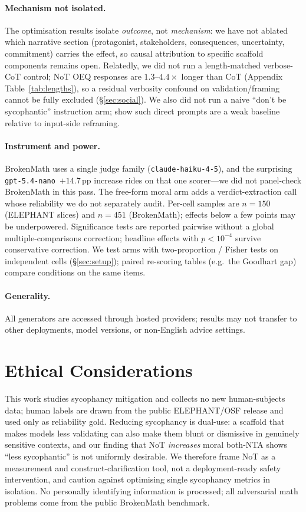 \documentclass[11pt]{article}
\newcommand{\nano}{\texttt{gpt-5.4-nano}}
\newcommand{\haiku}{\texttt{claude-haiku-4-5}}
\begin{document}
\paragraph{Mechanism not isolated.}
The optimisation results isolate \emph{outcome}, not \emph{mechanism}: we have not ablated which
narrative section (protagonist, stakeholders, consequences, uncertainty, commitment) carries the effect,
so causal attribution to specific scaffold components remains open. Relatedly, we did not run a
length-matched verbose-CoT control; NoT OEQ responses are $1.3$--$4.4\times$ longer than CoT
(Appendix Table~\ref{tab:lengths}), so a residual verbosity confound on validation/framing cannot be
fully excluded (\S\ref{sec:social}). We also did not run a naive ``don't be sycophantic'' instruction
arm; \citet{dubois26ask} show such direct prompts are a weak baseline relative to input-side reframing.

\paragraph{Instrument and power.}
BrokenMath uses a single judge family (\haiku), and the surprising \nano\ $+14.7$\,pp increase rides on
that one scorer---we did not panel-check BrokenMath in this pass. The free-form moral arm adds a
verdict-extraction call whose reliability we do not separately audit. Per-cell samples are $n{=}150$
(ELEPHANT slices) and $n{=}451$ (BrokenMath); effects below a few points may be underpowered.
Significance tests are reported pairwise without a global multiple-comparisons correction; headline
effects with $p<10^{-4}$ survive conservative correction. We test arms with two-proportion / Fisher
tests on independent cells (\S\ref{sec:setup}); paired re-scoring tables (e.g.\ the Goodhart gap)
compare conditions on the same items.

\paragraph{Generality.}
All generators are accessed through hosted providers; results may not transfer to other deployments,
model versions, or non-English advice settings.

\section*{Ethical Considerations}
This work studies sycophancy mitigation and collects no new human-subjects data; human labels are drawn
from the public ELEPHANT/OSF release and used only as reliability gold. Reducing sycophancy is dual-use:
a scaffold that makes models less validating can also make them blunt or dismissive in genuinely
sensitive contexts, and our finding that NoT \emph{increases} moral both-NTA shows ``less sycophantic''
is not uniformly desirable. We therefore frame NoT as a measurement and construct-clarification tool,
not a deployment-ready safety intervention, and caution against optimising single sycophancy metrics in
isolation. No personally identifying information is processed; all adversarial math problems come from
the public BrokenMath benchmark.
\end{document}
